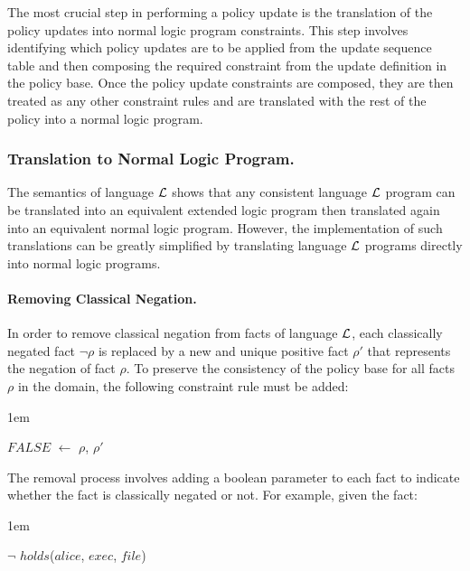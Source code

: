 \documentclass[global,twocolumn,final]{svjour}
\newenvironment{vquote}
  {\begin{list}{}{\leftmargin 1em}\item[]}
  {\end{list}}
\begin{document}
        The most crucial step in performing a policy update is the translation
        of the policy updates into normal logic program constraints. This step
        involves identifying which policy updates are to be applied from the
        update sequence table and then composing the required constraint from
        the update definition in the policy base. Once the policy update
        constraints are composed, they are then treated as any other
        constraint rules and are translated with the rest of the policy into
        a normal logic program.

      \subsubsection{Translation to Normal Logic Program.}

        The semantics of language ${\cal L}$ shows that any consistent language
        ${\cal L}$ program can be translated into an equivalent extended logic
        program then translated again into an equivalent normal logic program.
        However, the implementation of such translations can be greatly
        simplified by translating language ${\cal L}$ programs directly into
        normal logic programs.

        \paragraph{Removing Classical Negation.}

          In order to remove classical negation from facts of language
          ${\cal L}$, each classically negated fact $\lnot$$\rho$ is replaced
          by a new and unique positive fact $\rho'$ that represents the
          negation of fact $\rho$. To preserve the consistency of the policy
          base for all facts $\rho$ in the domain, the following constraint
          rule must be added:

          \begin{vquote}
            $FALSE$ $\leftarrow$ $\rho$, $\rho'$
          \end{vquote}

          The removal process involves adding a boolean parameter to each fact
          to indicate whether the fact is classically negated or not. For
          example, given the fact:

          \begin{vquote}
            $\lnot$ $holds$($alice$, $exec$, $file$)
          \end{vquote}
\end{document}

